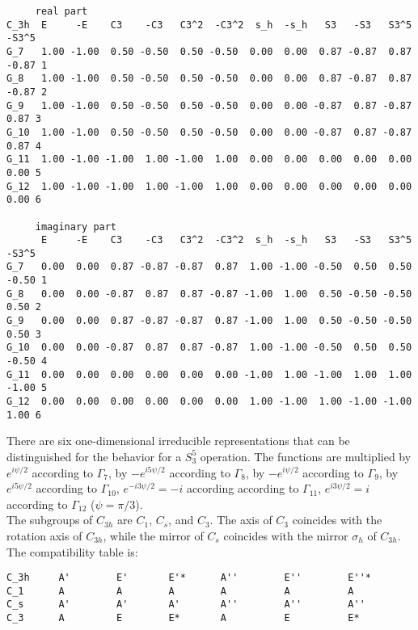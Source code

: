 \documentclass[12pt,a4paper,twoside]{report}
\begin{document}
\begin{tcolorbox}
\begin{scriptsize}
\begin{verbatim}
     real part
C_3h  E     -E    C3    -C3   C3^2  -C3^2  s_h  -s_h   S3   -S3   S3^5 -S3^5
G_7   1.00 -1.00  0.50 -0.50  0.50 -0.50  0.00  0.00  0.87 -0.87  0.87 -0.87 1
G_8   1.00 -1.00  0.50 -0.50  0.50 -0.50  0.00  0.00  0.87 -0.87  0.87 -0.87 2
G_9   1.00 -1.00  0.50 -0.50  0.50 -0.50  0.00  0.00 -0.87  0.87 -0.87  0.87 3
G_10  1.00 -1.00  0.50 -0.50  0.50 -0.50  0.00  0.00 -0.87  0.87 -0.87  0.87 4
G_11  1.00 -1.00 -1.00  1.00 -1.00  1.00  0.00  0.00  0.00  0.00  0.00  0.00 5
G_12  1.00 -1.00 -1.00  1.00 -1.00  1.00  0.00  0.00  0.00  0.00  0.00  0.00 6

     imaginary part
      E     -E    C3    -C3   C3^2  -C3^2  s_h  -s_h   S3   -S3   S3^5 -S3^5
G_7   0.00  0.00  0.87 -0.87 -0.87  0.87  1.00 -1.00 -0.50  0.50  0.50 -0.50 1
G_8   0.00  0.00 -0.87  0.87  0.87 -0.87 -1.00  1.00  0.50 -0.50 -0.50  0.50 2
G_9   0.00  0.00  0.87 -0.87 -0.87  0.87 -1.00  1.00  0.50 -0.50 -0.50  0.50 3
G_10  0.00  0.00 -0.87  0.87  0.87 -0.87  1.00 -1.00 -0.50  0.50  0.50 -0.50 4
G_11  0.00  0.00  0.00  0.00  0.00  0.00 -1.00  1.00 -1.00  1.00  1.00 -1.00 5
G_12  0.00  0.00  0.00  0.00  0.00  0.00  1.00 -1.00  1.00 -1.00 -1.00  1.00 6
\end{verbatim}
\end{scriptsize}
\end{tcolorbox}

There are six one-dimensional irreducible representations that can be
distinguished for the behavior for a $S_3^5$ operation. The functions
are multiplied by $e^{i\psi/2}$ according to $\Gamma_7$, by $-e^{i5\psi/2}$
according to $\Gamma_8$, by $-e^{i\psi/2}$ according to $\Gamma_9$,
by $e^{i5\psi/2}$ according to $\Gamma_{10}$, $e^{-i3\psi/2}=-i$ according
according to $\Gamma_{11}$, $e^{i3\psi/2}=i$ according to $\Gamma_{12}$
($\psi=\pi/3$).\\
The subgroups of $C_{3h}$ are $C_1$, $C_s$, and $C_3$. The axis of $C_3$
coincides with the rotation axis of $C_{3h}$, while the mirror of $C_s$ coincides
with the mirror $\sigma_h$ of $C_{3h}$. \\ 
The compatibility table is:

\begin{tcolorbox}
\begin{footnotesize}
\begin{verbatim}
C_3h     A'        E'       E'*      A''        E''        E''* 
C_1      A         A        A        A          A          A
C_s      A'        A'       A'       A''        A''        A''
C_3      A         E        E*       A          E          E*
\end{verbatim}
\end{footnotesize}
\end{tcolorbox}
\end{document}
